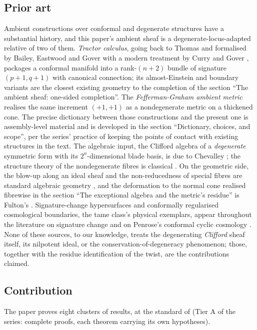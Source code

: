 \documentclass[11pt]{article}
\theoremstyle{definition}
\theoremstyle{plain}
\begin{document}
\subsection*{Prior art}
\label{c:note.sheaf.setting-prior-art}
Ambient constructions over conformal and degenerate structures have a substantial history, and this paper's ambient sheaf is a degenerate-locus-adapted relative of two of them. \emph{Tractor calculus}, going back to Thomas and formalised by Bailey, Eastwood and Gover \cite{BEG1994} with a modern treatment by Curry and Gover \cite{CurryGover2018}, packages a conformal manifold into a rank-$(n{+}2)$ bundle of signature $(p{+}1,q{+}1)$ with canonical connection; its almost-Einstein and boundary variants are the closest existing geometry to the completion of the section ``The ambient sheaf: one-sided completion''. The \emph{Fefferman-Graham ambient metric} \cite{FG1985, FG2012} realises the same increment $(+1,+1)$ as a nondegenerate metric on a thickened cone. The precise dictionary between those constructions and the present one is assembly-level material and is developed in the section ``Dictionary, choices, and scope'', per the series' practice of keeping the points of contact with existing structures in the text. The algebraic input, the Clifford algebra of a \emph{degenerate} symmetric form with its $2^n$-dimensional blade basis, is due to Chevalley \cite{Chevalley1997}; the structure theory of the nondegenerate fibres is classical \cite{Porteous1995, Lounesto2001, Lam2005}. On the geometric side, the blow-up along an ideal sheaf and the non-reducedness of special fibres are standard algebraic geometry \cite{Hartshorne1977}, and the deformation to the normal cone realised fibrewise in the section ``The exceptional algebra and the metric's residue'' is Fulton's \cite[Ch.~5]{Fulton1998}. Signature-change hypersurfaces and conformally regularised cosmological boundaries, the tame class's physical exemplars, appear throughout the literature on signature change and on Penrose's conformal cyclic cosmology \cite{Penrose2010}. None of these sources, to our knowledge, treats the degenerating \emph{Clifford} sheaf itself, its nilpotent ideal, or the conservation-of-degeneracy phenomenon; those, together with the residue identification of the twist, are the contributions claimed.

\subsection*{Contribution}
\label{c:note.sheaf.setting-contribution}
The paper proves eight clusters of results, at the standard of \cite{ButlerT1} (Tier A of the series: complete proofs, each theorem carrying its own hypotheses).
\end{document}

